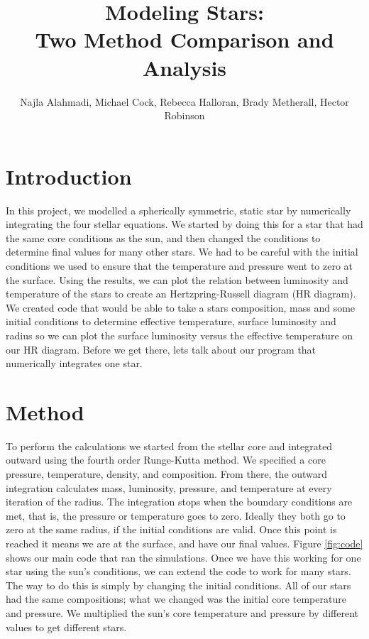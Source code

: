 \documentclass[10pt]{article}
\title{Modeling Stars: \\ Two Method Comparison and Analysis}
\author{Najla Alahmadi, Michael Cock, Rebecca Halloran, Brady Metherall, Hector Robinson}
\begin{document}
\maketitle

\lstset{style=mystyle}
\section{Introduction}
In this project, we modelled a spherically symmetric, static star by numerically integrating the four stellar equations. We started by doing this for a star that had the same core conditions as the sun, and then changed the conditions to determine final values for many other stars. We had to be careful with the initial conditions we used to ensure that the temperature and pressure went to zero at the surface. Using the results, we can plot the relation between luminosity and temperature of the stars to create an Hertzpring-Russell diagram (HR diagram). We created code that would be able to take a stars composition, mass and some initial conditions to determine effective temperature, surface luminosity and radius so we can plot the surface luminosity versus the effective temperature on our HR diagram. Before we get there, lets talk about our program that numerically integrates one star. \\

\section{Method}
To perform the calculations we started from the stellar core and integrated outward using the fourth order Runge-Kutta method. We specified a core pressure, temperature, density, and composition. From there, the outward integration calculates mass, luminosity, pressure, and temperature at every iteration of the radius. The integration stops when the boundary conditions are met, that is, the pressure or temperature goes to zero. Ideally they both go to zero at the same radius, if the initial conditions are valid. Once this point is reached it means we are at the surface, and have our final values. Figure \ref{fig:code} shows our main code that ran the simulations. Once we have this working for one star using the sun's conditions, we can extend the code to work for many stars. The way to do this is simply by changing the initial conditions. All of our stars had the same compositions; what we changed was the initial core temperature and pressure. We multiplied the sun's core temperature and pressure by different values to get different stars.\\
\end{document}
